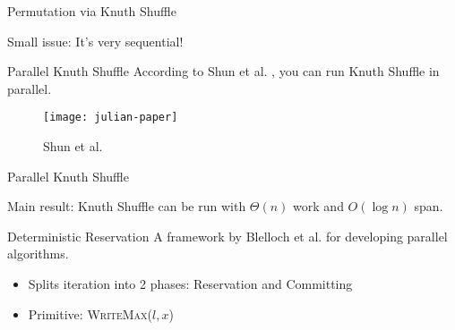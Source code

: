 \begin{frame}{Permutation via Knuth Shuffle}
  \begin{center}
    \Large{Small issue: It's very sequential!}
  \end{center}
\end{frame}

\begin{frame}{Parallel Knuth Shuffle}
  According to Shun et al. \cite{julian-parperm}, you can run Knuth Shuffle in
  parallel.

  \begin{figure}
    \begin{center}
      \texttt{[image: julian-paper]}
    \end{center}
    \caption{Shun et al. \cite{julian-parperm}}
  \end{figure}
\end{frame}

\begin{frame}{Parallel Knuth Shuffle}
  \begin{center}
    \Large{ Main result: Knuth Shuffle can be run with \(\Theta(n)\) work and
    \(O(\log n)\) span. }
  \end{center}
\end{frame}

\begin{frame}{Deterministic Reservation}
  A framework by Blelloch et al. \cite{blelloch-detreserve} for developing
  parallel algorithms.
  \begin{itemize}
    \item Splits iteration into 2 phases: Reservation and Committing
    \item Primitive: \textsc{WriteMax(\(l, x\))} 
  \end{itemize}
\end{frame}
